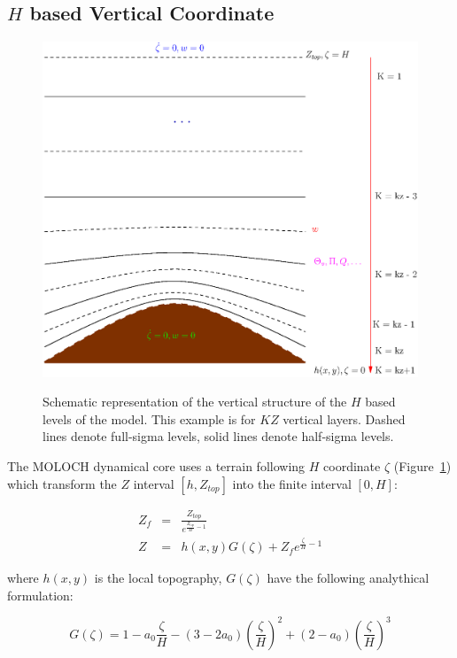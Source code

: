 \subsection{$H$ based Vertical Coordinate}
\label{h_coordinate}

\begin{figure}
\begin{center}
\resizebox{3.5in}{!}
{\includegraphics{moloch_levels.eps}}
\caption{Schematic representation of the vertical structure of the $H$
based levels of the model.
This example is for $KZ$ vertical layers. Dashed lines denote full-sigma levels,
solid lines denote half-sigma levels.}
\label{moloch_levels}
\end{center}
\end{figure}

The \ac{MOLOCH} dynamical core uses a terrain following $H$ coordinate
$\zeta$ (Figure~\ref{moloch_levels}) which transform the $Z$
interval $[h, Z_{top}]$ into the finite interval $[0,H]$:

\begin{eqnarray}
  Z_f &=& \frac{Z_{top}}{e^{\frac{Z_{top}}{H}-1}} \\
  Z &=& h(x,y) G(\zeta) + Z_f e^{\frac{\zeta}{H}-1}
\end{eqnarray}

where $h(x,y)$ is the local topography, $G(\zeta)$ have the
following analythical formulation:

\begin{equation}
G(\zeta) = 1 - a_0 \frac{\zeta}{H} -
       (3 - 2 a_0)\left( \frac{\zeta}{H} \right)^2 +
       (2 - a_0) \left( \frac{\zeta}{H} \right)^3
\end{equation}

